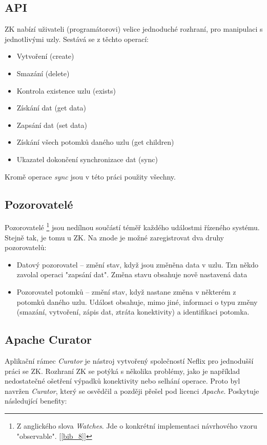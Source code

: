 \documentclass[
  digital, %
  table,   %
  nolof,     %
  nolot,     %
  oneside, %
  nocover,
  monochrome,
  12pt
]{fithesis3}
\begin{document}
\subsection*{API}
ZK nabízí uživateli (programátorovi) velice jednoduché rozhraní, pro manipulaci s jednotlivými uzly. Sestává se z těchto operací:
\begin{itemize}
  \item Vytvoření (create)
  \item Smazání (delete)
  \item Kontrola existence uzlu (exists)
  \item Získání dat (get data)
  \item Zapsání dat (set data)
  \item Získání všech potomků daného uzlu (get children)
  \item Ukazatel dokončení synchronizace dat (sync)
\end{itemize}

Kromě operace \textit{sync} jsou v této práci použity všechny.

\subsection*{Pozorovatelé}
Pozorovatelé \footnote{Z anglického slova \textit{Watches}. Jde o konkrétní implementaci návrhového vzoru "observable". [\ref{bib_8}]} jsou nedílnou součástí téměř každého událostmi řízeného systému. Stejně tak, je tomu u ZK. Na znode je možné zaregistrovat dva druhy pozorovatelů:

\begin{itemize}
  \item Datový pozorovatel -- změní stav, když jsou změněna data v uzlu. Tzn někdo zavolal operaci "zapsání dat". Změna stavu obsahuje nově nastavená data
  \item Pozorovatel potomků -- změní stav, když nastane změna v některém z potomků daného uzlu. Událost obsahuje, mimo jiné, informaci o typu změny (smazání, vytvoření, zápis dat, ztráta konektivity) a identifikaci potomka. 
\end{itemize}

\subsection*{Apache Curator}
Aplikační rámec \textit{Curator}	je nástroj vytvořený společností Neflix pro jednodušší práci se ZK. Rozhraní ZK se potýká s několika problémy, jako je například nedostatečné ošetření výpadků konektivity nebo selhání operace. Proto byl navržen \textit{Curator}, který se osvědčil a později přešel pod licenci \textit{Apache}. Poskytuje následující benefity:
\end{document}
